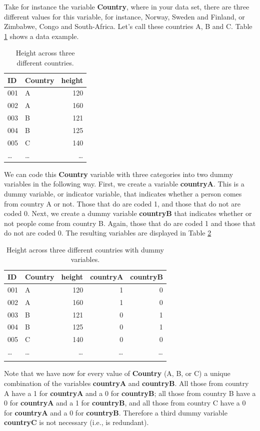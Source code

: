 \documentclass[]{book}\usepackage[]{graphicx}\usepackage[]{color}
\begin{document}
Take for instance the variable \textbf{Country}, where in your data set, there are three different values for this variable, for instance, Norway, Sweden and Finland, or Zimbabwe, Congo and South-Africa. Let's call these countries A, B and C. Table \ref{tab:countryheight} shows a data example.
 
 \begin{table}
 \caption{Height across three different countries.}
 \begin{tabular}{llr}
 ID & Country &  height\\ \hline
  001 &A & 120\\
  002 &A & 160\\
  003 &B & 121\\
  004 &B & 125\\
  005 &C & 140\\
  \dots & \dots & \dots\\
 \end{tabular} 
 \label{tab:countryheight}
 \end{table}


We can code this \textbf{Country} variable with three categories into two dummy variables in the following way. First, we create a variable \textbf{countryA}. This is a dummy variable, or indicator variable, that indicates whether a person comes from country A or not. Those that do are coded 1, and those that do not are coded 0. Next, we create a dummy variable \textbf{countryB} that indicates whether or not people come from country B. Again, those that do are coded 1 and those that do not are coded 0. The resulting variables are displayed in Table \ref{tab:dummy}
 
 \begin{table}
 \caption{Height across three different countries with dummy variables.}
 \begin{tabular}{llrrr}
 ID & Country &  height & countryA & countryB \\ \hline
  001 &A & 120 & 1 & 0\\
  002 &A & 160 & 1 & 0\\
  003 &B & 121 & 0 & 1\\
  004 &B & 125 & 0 & 1\\
  005 &C & 140 & 0 & 0\\
  \dots & \dots & \dots& \dots & \dots\\
  \label{tab:dummy}
 \end{tabular}
 \end{table}

Note that we have now for every value of \textbf{Country} (A, B, or C) a unique combination of the variables \textbf{countryA} and \textbf{countryB}. All those from country A have a 1 for \textbf{countryA} and a 0 for \textbf{countryB}; all those from country B have a 0 for \textbf{countryA} and a 1 for \textbf{countryB}, and all those from country C have a 0 for \textbf{countryA} and a 0 for \textbf{countryB}. Therefore a third dummy variable \textbf{countryC} is not necessary (i.e., is redundant). 
\end{document}
